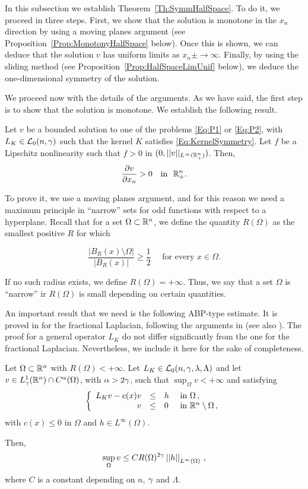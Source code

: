 In this subsection we establish Theorem~\ref{Th:SymmHalfSpace}. To do it, we proceed in three steps. First, we show that the solution is monotone in the $x_n$ direction by using a moving planes argument (see Proposition~\ref{Prop:MonotonyHalfSpace} below). Once this is shown, we can deduce that the solution $v$ has uniform limits as $x_n\pm\to \infty$. Finally, by using the sliding method (see Proposition~\ref{Prop:HalfSpaceLimUnif} below), we deduce the one-dimensional symmetry of the solution.

We proceed now with the details of the arguments. As we have said, the first step is to show that the solution is monotone. We establish the following result.

\begin{proposition}
	\label{Prop:MonotonyHalfSpace}
	Let $v$ be a bounded solution to one of the problems \eqref{Eq:P1} or \eqref{Eq:P2}, with $L_K \in \mathcal{L}_0(n,\gamma)$ such that the kernel $K$ satisfies \eqref{Eq:KernelSymmetry}. Let $f$ be a Lipschitz nonlinearity such that $f>0$ in $(0,||v||_{L^\infty(\mathbb{R}^n_+)})$. Then,
	$$
	\frac{\partial v}{\partial x_n} > 0 \,\,\,\, \text{ in } \,\,\mathbb{R}^n_+.
	$$
\end{proposition}

To prove it, we use a moving planes argument, and for this reason we need a maximum principle in ``narrow'' sets for odd functions with respect to a hyperplane. Recall that for a set $\Omega \subset \mathbb{R}^n$, we define the quantity $R(\Omega)$ as the smallest positive $R$ for which

\begin{equation}
	\label{Eq:DefNarrow}
	\dfrac{|B_R(x)\setminus \Omega|}{|B_R(x)|}\geq \dfrac{1}{2} \quad \text{ for every } x \in \Omega.
\end{equation}

If no such radius exists, we define $R(\Omega) = +\infty$. Thus, we say that a set $\Omega$ is ``narrow'' ir $R(\Omega)$ is small depending on certain quantities.

An important result that we need is the following ABP-type estimate. It is proved in \cite{QuaasXia} for the fractional Laplacian, following the arguments in \cite{Cabre-ABP} (see also \cite{Cabre-Topics}). The proof for a general operator $L_K$ do not differ significantly from the one for the fractional Laplacian. Nevertheless, we include it here for the sake of completeness.

\begin{theorem}
	\label{Th:ABPEstimate}
	Let $\Omega \subset \mathbb{R}^n$ with $R(\Omega) < +\infty$. Let $L_K \in \mathcal{L}_0(n,\gamma,\lambda, \Lambda)$ and let $v\in L^1_\gamma(\mathbb{R}^n)\cap C^{\alpha}(\Omega)$, with $\alpha > 2\gamma$, such that $\sup_{\Omega} v < +\infty$ and satisfying
	$$
	\left\{\begin{array}{rcll}
	L_K v - c(x)v &\leq & h & \text{ in } \Omega\,, \\
	v & \leq & 0 & \text{ in } \mathbb{R}^n\setminus \Omega\,,
	\end{array} \right.
	$$
	with $c(x)\leq 0$ in $\Omega$ and $h\in L^\infty(\Omega)$.
	
	Then,
	$$
	\sup_\Omega v \leq C R(\Omega)^{2\gamma} \left | \left |{h} \right | \right |_{L^{\infty}(\Omega)}\,,
	$$
	where $C$ is a constant depending on $n$, $\gamma$ and $\Lambda$.
\end{theorem}


